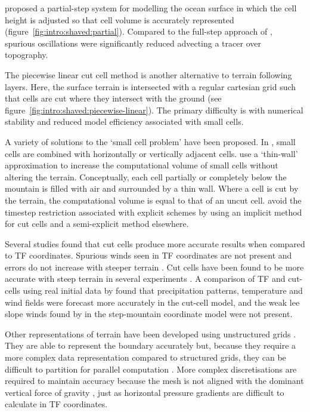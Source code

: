 \textcite{adcroft1997} proposed a partial-step system for modelling the ocean surface in which the cell height is adjusted so that cell volume is accurately represented (figure~\ref{fig:intro:shaved:partial}).  Compared to the full-step approach of \textcite{mesinger1988}, spurious oscillations were significantly reduced advecting a tracer over topography.

The piecewise linear cut cell method is another alternative to terrain following layers.  Here, the surface terrain is intersected with a regular cartesian grid such that cells are cut where they intersect with the ground (see figure~\ref{fig:intro:shaved:piecewise-linear}).  The primary difficulty is with numerical stability and reduced model efficiency associated with small cells. 

A variety of solutions to the `small cell problem' have been proposed.  In \textcite{yamazaki-satomura2010}, small cells are combined with horizontally or vertically adjacent cells.  \textcite{steppeler2002} use a `thin-wall' approximation to increase the computational volume of small cells without altering the terrain.  Conceptually, each cell partially or completely below the mountain is filled with air and surrounded by a thin wall.  Where a cell is cut by the terrain, the computational volume is equal to that of an uncut cell.  \textcite{jebens2011} avoid the timestep restriction associated with explicit schemes by using an implicit method for cut cells and a semi-explicit method elsewhere.

Several studies found that cut cells produce more accurate results when compared to TF coordinates.  Spurious winds seen in TF coordinates are not present and errors do not increase with steeper terrain \autocite{good2013}.  Cut cells have been found to be more accurate with steep terrain in several experiments \parencites{good2013}{yamazaki-satomura2010}.  A comparison of TF and cut-cells using real initial data by \textcite{steppeler2006} found that precipitation patterns, temperature and wind fields were forecast more accurately in the cut-cell model, and the weak lee slope winds found by \textcite{gallus-klemp2000} in the step-mountain coordinate model were not present.  

Other representations of terrain have been developed using unstructured grids \parencites{ss2011}{others}.  They are able to represent the boundary accurately but, because they require a more complex data representation compared to structured grids, they can be difficult to partition for parallel computation \autocite{steppeler2003}.  More complex discretisations are required to maintain accuracy because the mesh is not aligned with the dominant vertical force of gravity \autocite{rosatti2005}, just as horizontal pressure gradients are difficult to calculate in TF coordinates.

